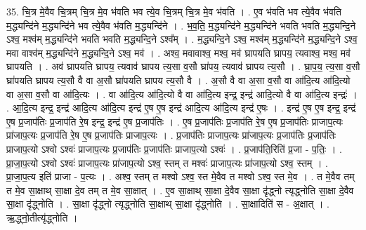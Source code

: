 \documentclass[17pt]{extarticle}
\begin{document}
35. चि॒त्र मे॒वैव चि॒त्रम् चि॒त्र मे॒व भ॑वति भव त्ये॒व चि॒त्रम् चि॒त्र मे॒व भ॑वति । . ए॒व भ॑वति भव त्ये॒वैव भ॑वति म॒द्ध्यन्दि॑ने म॒द्ध्यन्दि॑ने भव त्ये॒वैव भ॑वति म॒द्ध्यन्दि॑ने । . भ॒व॒ति॒ म॒द्ध्यन्दि॑ने म॒द्ध्यन्दि॑ने भवति भवति म॒द्ध्यन्दि॒ने ऽश्व॒ मश्व॑म् म॒द्ध्यन्दि॑ने भवति भवति म॒द्ध्यन्दि॒ने ऽश्व᳚म् । . म॒द्ध्यन्दि॒ने ऽश्व॒ मश्व॑म् म॒द्ध्यन्दि॑ने म॒द्ध्यन्दि॒ने ऽश्व॒ मवा वाश्व॑म् म॒द्ध्यन्दि॑ने म॒द्ध्यन्दि॒ने ऽश्व॒ मव॑ । . अश्व॒ मवावाश्व॒ मश्व॒ मव॑ घ्रापयति घ्रापय॒ त्यवाश्व॒ मश्व॒ मव॑ घ्रापयति । . अव॑ घ्रापयति घ्रापय॒ त्यवाव॑ घ्रापय त्य॒सा व॒सौ घ्रा॑पय॒ त्यवाव॑ घ्रापय त्य॒सौ । . घ्रा॒प॒य॒ त्य॒सा व॒सौ घ्रा॑पयति घ्रापय त्य॒सौ वै वा अ॒सौ घ्रा॑पयति घ्रापय त्य॒सौ वै । . अ॒सौ वै वा अ॒सा व॒सौ वा आ॑दि॒त्य आ॑दि॒त्यो वा अ॒सा व॒सौ वा आ॑दि॒त्यः । . वा आ॑दि॒त्य आ॑दि॒त्यो वै वा आ॑दि॒त्य इन्द्र॒ इन्द्र॑ आदि॒त्यो वै वा आ॑दि॒त्य इन्द्रः॑ । . आ॒दि॒त्य इन्द्र॒ इन्द्र॑ आदि॒त्य आ॑दि॒त्य इन्द्र॑ ए॒ष ए॒ष इन्द्र॑ आदि॒त्य आ॑दि॒त्य इन्द्र॑ ए॒षः । . इन्द्र॑ ए॒ष ए॒ष इन्द्र॒ इन्द्र॑ ए॒ष प्र॒जाप॑तिः प्र॒जाप॑ति रे॒ष इन्द्र॒ इन्द्र॑ ए॒ष प्र॒जाप॑तिः । . ए॒ष प्र॒जाप॑तिः प्र॒जाप॑ति रे॒ष ए॒ष प्र॒जाप॑तिः प्राजाप॒त्यः प्रा॑जाप॒त्यः प्र॒जाप॑ति रे॒ष ए॒ष प्र॒जाप॑तिः प्राजाप॒त्यः । . प्र॒जाप॑तिः प्राजाप॒त्यः प्रा॑जाप॒त्यः प्र॒जाप॑तिः प्र॒जाप॑तिः प्राजाप॒त्यो ऽश्वो ऽश्वः॑ प्राजाप॒त्यः प्र॒जाप॑तिः प्र॒जाप॑तिः प्राजाप॒त्यो ऽश्वः॑ । . प्र॒जाप॑ति॒रिति॑ प्र॒जा - प॒तिः॒ । . प्रा॒जा॒प॒त्यो ऽश्वो ऽश्वः॑ प्राजाप॒त्यः प्रा॑जाप॒त्यो ऽश्व॒ स्तम् त मश्वः॑ प्राजाप॒त्यः प्रा॑जाप॒त्यो ऽश्व॒ स्तम् । . प्रा॒जा॒प॒त्य इति॑ प्राजा - प॒त्यः । . अश्व॒ स्तम् त मश्वो ऽश्व॒ स्त मे॒वैव त मश्वो ऽश्व॒ स्त मे॒व । . त मे॒वैव तम् त मे॒व सा॒क्षाथ् सा॒क्षा दे॒व तम् त मे॒व सा॒क्षात् । . ए॒व सा॒क्षाथ् सा॒क्षा दे॒वैव सा॒क्षा दृ॑द्ध्नो त्यृद्ध्नोति सा॒क्षा दे॒वैव सा॒क्षा दृ॑द्ध्नोति । . सा॒क्षा दृ॑द्ध्नो त्यृद्ध्नोति सा॒क्षाथ् सा॒क्षा दृ॑द्ध्नोति । . सा॒क्षादिति॑ स - अ॒क्षात् । . ऋ॒द्ध्नो॒तीत्यृ॑द्ध्नोति । \newline
\pagebreak
{}
\end{document}
